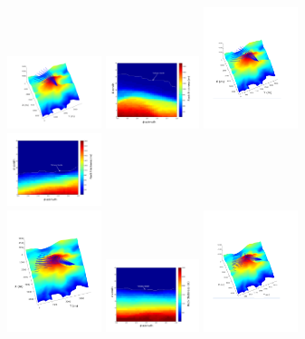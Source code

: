 \documentclass[letterpaper,10pt,titlepage,linenumber]{article}
\begin{document}
\begin{figure}[!h]
\centering
{\includegraphics[width=0.245\textwidth]{Figures/Paths1CH}}
{\includegraphics[width=0.245\textwidth]{Figures/Distance1CH}}
{\includegraphics[width=0.245\textwidth]{Figures/Paths2CH}}
{\includegraphics[width=0.245\textwidth]{Figures/Distance2CH}}\\
{\includegraphics[width=0.245\textwidth]{Figures/Paths3CH}}
{\includegraphics[width=0.245\textwidth]{Figures/Distance3CH}} 
{\includegraphics[width=0.245\textwidth]{Figures/Paths4CH}}

\end{figure}
\end{document}
